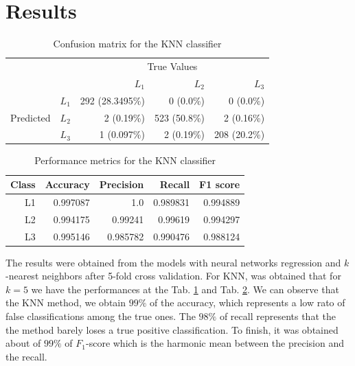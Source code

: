 \documentclass[conference]{IEEEtran}
\begin{document}
\section{Results} \label{sec:results}

\begin{table}
\centering
  \caption{Confusion matrix for the KNN classifier}
  \label{tab:conf_mat_knn}
  \begin{tabular}{rrrrr}
    \toprule
    & &\multicolumn{3}{c}{True Values}\\
    & & ${L_1}$ & ${L_2}$ & ${L_3}$ \\
    \multirow{3}{*}{Predicted} & ${L_1}$ & 292 (28.3495\%) & 0 (0.0\%) & 0 (0.0\%) \\
    & ${L_2}$ & 2 (0.19\%) & 523 (50.8\%) & 2 (0.16\%) \\
    & ${L_3}$ & 1 (0.097\%) & 2 (0.19\%) & 208 (20.2\%) \\\bottomrule
  \end{tabular}
\end{table}
\begin{table}
\centering
 \caption{Performance metrics for the KNN classifier}  
 \label{tab:perf_met_knn}
 \begin{tabular}{rrrrr}    \hline\hline    \textbf{Class} & \textbf{Accuracy} & \textbf{Precision} & \textbf{Recall} & \textbf{F1 score} \\ \hline    L1 & 0.997087 & 1.0 & 0.989831 & 0.994889 \\\     L2 & 0.994175 & 0.99241 & 0.99619 & 0.994297 \\     L3 & 0.995146 & 0.985782 & 0.990476 & 0.988124 \\ \hline\hline  \end{tabular}
\end{table}

The results were obtained from the models with neural networks regression and $k$-nearest neighbors after 5-fold cross validation. For KNN, was obtained that for $k=5$ we have the performances at the Tab. \ref{tab:conf_mat_knn} and Tab. \ref{tab:perf_met_knn}. We can observe that the KNN method, we obtain $99\%$ of the accuracy, which represents a low rato of false classifications among the true ones. The $98\%$ of recall represents that the the method barely loses a true positive classification. To finish, it was obtained about of $99\%$ of $F_1$-score which is the harmonic mean between the precision and the recall.
\end{document}
